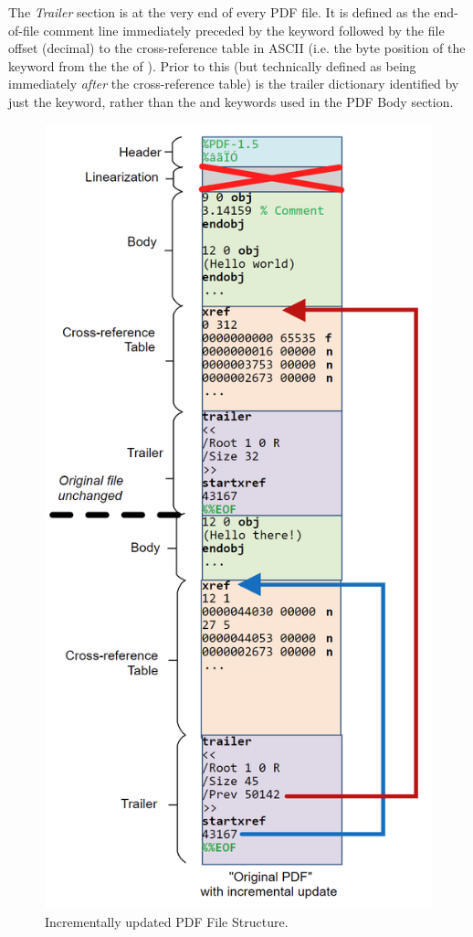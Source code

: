 The \emph{Trailer} section is at the very end of every PDF file. 
It is defined as the end-of-file comment line  immediately
preceded by the  keyword followed by the file offset (decimal) to 
the cross-reference table in ASCII (i.e. the byte position of the  keyword 
from the the \lstcd{\%} of ). Prior to this (but technically 
defined as being immediately \emph{after} the cross-reference table) is the trailer dictionary
identified by just the  keyword, rather than the  and 
keywords used in the PDF Body section.

\begin{figure}[t]
    \centering
    \includegraphics[width=0.65\linewidth]{figures/pdf-structure-incremental.png}
    \caption{Incrementally updated PDF File Structure.}
    \label{fig:pdf-structure-incremental}
\end{figure}

